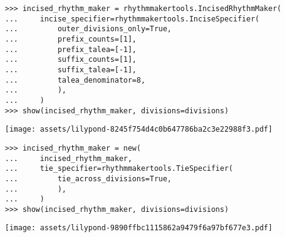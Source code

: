 \begin{comment}
<abjad>
incised_rhythm_maker = rhythmmakertools.IncisedRhythmMaker(
    incise_specifier=rhythmmakertools.InciseSpecifier(
        outer_divisions_only=True,
        prefix_counts=[1],
        prefix_talea=[-1],
        suffix_counts=[1],
        suffix_talea=[-1],
        talea_denominator=8,
        ),
    )
show(incised_rhythm_maker, divisions=divisions)
</abjad>
\end{comment}

\begin{singlespacing}
\vspace{-0.5\baselineskip}
\begin{lstlisting}
>>> incised_rhythm_maker = rhythmmakertools.IncisedRhythmMaker(
...     incise_specifier=rhythmmakertools.InciseSpecifier(
...         outer_divisions_only=True,
...         prefix_counts=[1],
...         prefix_talea=[-1],
...         suffix_counts=[1],
...         suffix_talea=[-1],
...         talea_denominator=8,
...         ),
...     )
>>> show(incised_rhythm_maker, divisions=divisions)
\end{lstlisting}
\noindent\texttt{[image: assets/lilypond-8245f754d4c0b647786ba2c3e22988f3.pdf]}
\end{singlespacing}

\begin{comment}
<abjad>
incised_rhythm_maker = new(
    incised_rhythm_maker,
    tie_specifier=rhythmmakertools.TieSpecifier(
        tie_across_divisions=True,
        ),
    )
show(incised_rhythm_maker, divisions=divisions)
</abjad>
\end{comment}

\begin{singlespacing}
\vspace{-0.5\baselineskip}
\begin{lstlisting}
>>> incised_rhythm_maker = new(
...     incised_rhythm_maker,
...     tie_specifier=rhythmmakertools.TieSpecifier(
...         tie_across_divisions=True,
...         ),
...     )
>>> show(incised_rhythm_maker, divisions=divisions)
\end{lstlisting}
\noindent\texttt{[image: assets/lilypond-9890ffbc1115862a9479f6a97bf677e3.pdf]}
\end{singlespacing}

\begin{comment}
<abjad>
even_division_rhythm_maker = rhythmmakertools.EvenDivisionRhythmMaker()
show(even_division_rhythm_maker, divisions=divisions)
</abjad>
\end{comment}

